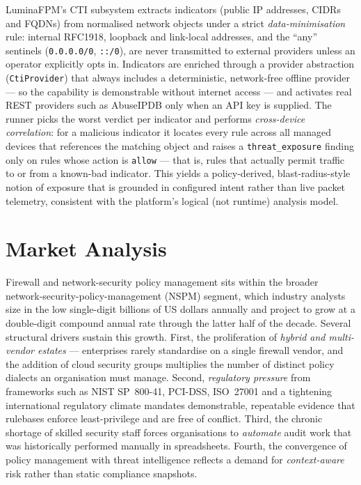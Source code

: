 LuminaFPM's CTI subsystem extracts indicators (public IP addresses, CIDRs and FQDNs) from normalised network objects under a strict \emph{data-minimisation} rule: internal RFC1918, loopback and link-local addresses, and the ``any'' sentinels (\texttt{0.0.0.0/0}, \texttt{::/0}), are never transmitted to external providers unless an operator explicitly opts in. Indicators are enriched through a provider abstraction (\texttt{CtiProvider}) that always includes a deterministic, network-free offline provider --- so the capability is demonstrable without internet access --- and activates real REST providers such as AbuseIPDB only when an API key is supplied. The runner picks the worst verdict per indicator and performs \emph{cross-device correlation}: for a malicious indicator it locates every rule across all managed devices that references the matching object and raises a \texttt{threat\_exposure} finding only on rules whose action is \texttt{allow} --- that is, rules that actually permit traffic to or from a known-bad indicator. This yields a policy-derived, blast-radius-style notion of exposure that is grounded in configured intent rather than live packet telemetry, consistent with the platform's logical (not runtime) analysis model.

\section{Market Analysis}
\label{sec:ch2-market}
Firewall and network-security policy management sits within the broader network-security-policy-management (NSPM) segment, which industry analysts size in the low single-digit billions of US dollars annually and project to grow at a double-digit compound annual rate through the latter half of the decade. Several structural drivers sustain this growth. First, the proliferation of \emph{hybrid and multi-vendor estates} --- enterprises rarely standardise on a single firewall vendor, and the addition of cloud security groups multiplies the number of distinct policy dialects an organisation must manage. Second, \emph{regulatory pressure} from frameworks such as NIST SP~800-41, PCI-DSS, ISO~27001 and a tightening international regulatory climate mandates demonstrable, repeatable evidence that rulebases enforce least-privilege and are free of conflict. Third, the chronic shortage of skilled security staff forces organisations to \emph{automate} audit work that was historically performed manually in spreadsheets. Fourth, the convergence of policy management with threat intelligence reflects a demand for \emph{context-aware} risk rather than static compliance snapshots.

